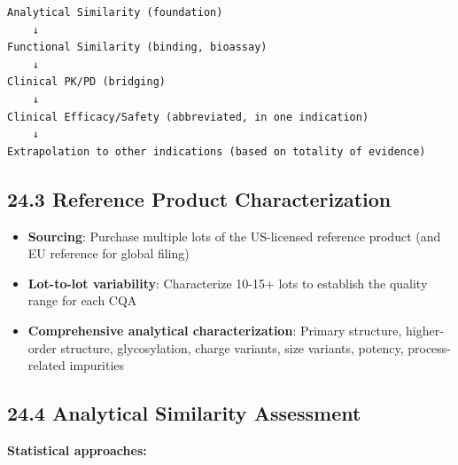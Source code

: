 \documentclass[
  11pt,
  a4paper,
]{report}
\providecommand{\tightlist}{%
  \setlength{\itemsep}{0pt}\setlength{\parskip}{0pt}}
\begin{document}
\begin{verbatim}
Analytical Similarity (foundation)
    ↓
Functional Similarity (binding, bioassay)
    ↓
Clinical PK/PD (bridging)
    ↓
Clinical Efficacy/Safety (abbreviated, in one indication)
    ↓
Extrapolation to other indications (based on totality of evidence)
\end{verbatim}

\hypertarget{reference-product-characterization}{%
\subsection{24.3 Reference Product
Characterization}\label{reference-product-characterization}}

\begin{itemize}
\tightlist
\item
  \textbf{Sourcing}: Purchase multiple lots of the US-licensed reference
  product (and EU reference for global filing)
\item
  \textbf{Lot-to-lot variability}: Characterize 10-15+ lots to establish
  the quality range for each CQA
\item
  \textbf{Comprehensive analytical characterization}: Primary structure,
  higher-order structure, glycosylation, charge variants, size variants,
  potency, process-related impurities
\end{itemize}

\hypertarget{analytical-similarity-assessment}{%
\subsection{24.4 Analytical Similarity
Assessment}\label{analytical-similarity-assessment}}

\textbf{Statistical approaches:}
\end{document}
